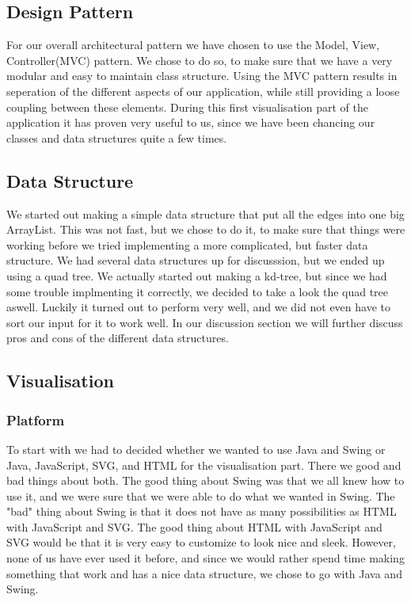 \documentclass[a4paper,11pt]{article}
\begin{document}
\subsection{Design Pattern} %
\label{sub:Design Pattern}
For our overall architectural pattern we have chosen to use the Model, View, Controller(MVC) pattern. We chose to do so, to make sure that we have
a very modular and easy to maintain class structure. Using the MVC pattern results in seperation of the different aspects of our application, while still providing a loose coupling between these elements. During this first visualisation part of the application it has proven very useful to us, since we
have been chancing our classes and data structures quite a few times.


\subsection{Data Structure} %
\label{sub:Data Structure}
We started out making a simple data structure that put all the edges into one big ArrayList. This was not fast, but we chose to do it, to make sure that
things were working before we tried implementing a more complicated, but faster data structure. We had several data structures up for discusssion, but we ended up using a quad tree. We actually started out making a kd-tree, but since we had some trouble implmenting it correctly, we decided to take a look
the quad tree aswell. Luckily it turned out to perform very well, and we did not even have to sort our input for it to work well. In our discussion 
section we will further discuss pros and cons of the different data structures.

\subsection{Visualisation} %
\label{sub:Visualisation}


\subsubsection{Platform} %
\label{subsub:Platform}
To start with we had to decided whether we wanted to use Java and Swing or Java, JavaScript, SVG, and HTML for the visualisation part. There we good and bad things about both. The good thing about Swing was that we all knew how to use it, and we were sure that we were able to do what we wanted in Swing.
The "bad" thing about Swing is that it does not have as many possibilities as HTML with JavaScript and SVG. The good thing about HTML with JavaScript and SVG would be that it is very easy to customize to look nice and sleek. However, none of us have ever used it before, and since we would rather spend time making something that work and has a nice data structure, we chose to go with Java and Swing.
\end{document}
